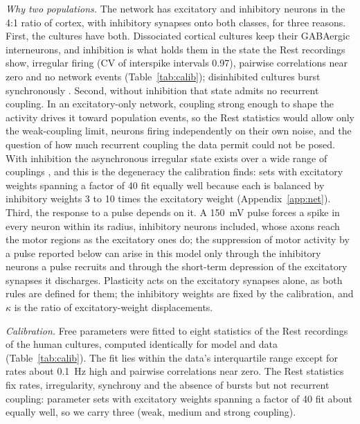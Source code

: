 \documentclass[pre,twocolumn,superscriptaddress,showpacs=false,amsmath,amssymb,nofootinbib]{revtex4-2}
\begin{document}
\emph{Why two populations.} The network has excitatory and inhibitory neurons in the 4:1 ratio of cortex, with inhibitory synapses onto both classes, for three reasons. First, the cultures have both. Dissociated cortical cultures keep their GABAergic interneurons, and inhibition is what holds them in the state the Rest recordings show, irregular firing (CV of interspike intervals 0.97), pairwise correlations near zero and no network events (Table~\ref{tab:calib}); disinhibited cultures burst synchronously \cite{Marom2002}. Second, without inhibition that state admits no recurrent coupling. In an excitatory-only network, coupling strong enough to shape the activity drives it toward population events, so the Rest statistics would allow only the weak-coupling limit, neurons firing independently on their own noise, and the question of how much recurrent coupling the data permit could not be posed. With inhibition the asynchronous irregular state exists over a wide range of couplings \cite{vanVreeswijk1996,Brunel2000}, and this is the degeneracy the calibration finds: sets with excitatory weights spanning a factor of 40 fit equally well because each is balanced by inhibitory weights 3 to 10 times the excitatory weight (Appendix~\ref{app:net}). Third, the response to a pulse depends on it. A 150~mV pulse forces a spike in every neuron within its radius, inhibitory neurons included, whose axons reach the motor regions as the excitatory ones do; the suppression of motor activity by a pulse reported below can arise in this model only through the inhibitory neurons a pulse recruits and through the short-term depression of the excitatory synapses it discharges. Plasticity acts on the excitatory synapses alone, as both rules are defined for them; the inhibitory weights are fixed by the calibration, and $\kappa$ is the ratio of excitatory-weight displacements.

\emph{Calibration.} Free parameters were fitted to eight statistics of the Rest recordings of the human cultures, computed identically for model and data (Table~\ref{tab:calib}). The fit lies within the data's interquartile range except for rates about 0.1~Hz high and pairwise correlations near zero. The Rest statistics fix rates, irregularity, synchrony and the absence of bursts but not recurrent coupling: parameter sets with excitatory weights spanning a factor of 40 fit about equally well, so we carry three (weak, medium and strong coupling).
\end{document}
